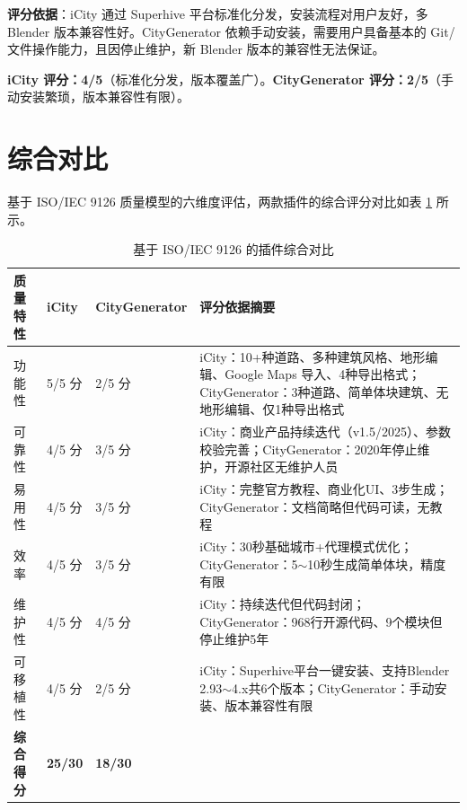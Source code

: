 \documentclass[UTF8,a4paper,10pt]{ctexart}
\begin{document}
\textbf{评分依据}：iCity 通过 Superhive 平台标准化分发，安装流程对用户友好，多 Blender 版本兼容性好。CityGenerator 依赖手动安装，需要用户具备基本的 Git/文件操作能力，且因停止维护，新 Blender 版本的兼容性无法保证。

\textbf{iCity 评分：4/5}（标准化分发，版本覆盖广）。\textbf{CityGenerator 评分：2/5}（手动安装繁琐，版本兼容性有限）。

\section{综合对比}

基于 ISO/IEC 9126 质量模型的六维度评估，两款插件的综合评分对比如表 \ref{tab:comparison} 所示。

\begin{table}[htbp]
\centering
\caption{基于 ISO/IEC 9126 的插件综合对比}
\label{tab:comparison}
\begin{tabular}{p{2cm}p{1.8cm}p{2.2cm}X}
\toprule
\textbf{质量特性} & \textbf{iCity} & \textbf{CityGenerator} & \textbf{评分依据摘要} \\
\midrule
功能性           & 5/5 分        & 2/5 分                 & iCity：10+种道路、多种建筑风格、地形编辑、Google Maps 导入、4种导出格式；CityGenerator：3种道路、简单体块建筑、无地形编辑、仅1种导出格式 \\
可靠性           & 4/5 分        & 3/5 分                 & iCity：商业产品持续迭代（v1.5/2025）、参数校验完善；CityGenerator：2020年停止维护，开源社区无维护人员 \\
易用性           & 4/5 分        & 3/5 分                 & iCity：完整官方教程、商业化UI、3步生成；CityGenerator：文档简略但代码可读，无教程\\
效率             & 4/5 分        & 3/5 分                 & iCity：30秒基础城市+代理模式优化；CityGenerator：5$\sim$10秒生成简单体块，精度有限\\
维护性           & 4/5 分        & 4/5 分                 & iCity：持续迭代但代码封闭；CityGenerator：968行开源代码、9个模块但停止维护5年\\
可移植性         & 4/5 分        & 2/5 分                 & iCity：Superhive平台一键安装、支持Blender 2.93$\sim$4.x共6个版本；CityGenerator：手动安装、版本兼容性有限\\
\midrule
\textbf{综合得分} & \textbf{25/30} & \textbf{18/30}         & \\
\bottomrule
\end{tabular}
\end{table}
\end{document}
